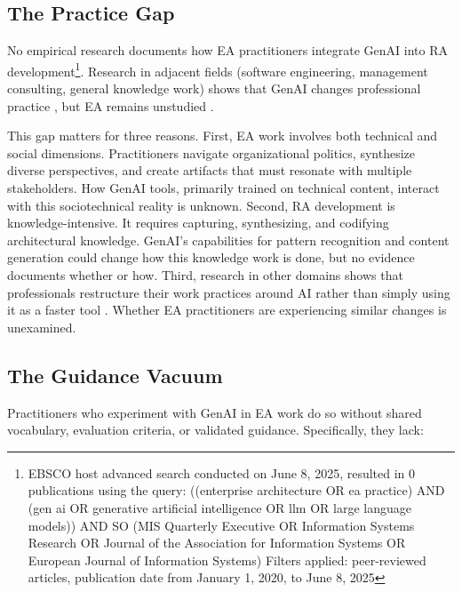 \subsection{The Practice Gap}

No empirical research documents how EA practitioners integrate GenAI into RA
development\footnote{ EBSCO host advanced search conducted on June 8, 2025,
    resulted in 0 publications using the query: ((enterprise architecture OR ea
    practice) AND (gen ai OR generative artificial intelligence OR llm OR large
    language models)) AND SO (MIS Quarterly Executive OR Information Systems
    Research OR Journal of the Association for Information Systems OR European
    Journal of Information Systems) Filters applied: peer-reviewed articles,
    publication date from January 1, 2020, to June 8, 2025
}. Research in adjacent fields (software engineering, management consulting,
general knowledge work) shows that GenAI changes professional practice
\parencite{peng_impact_2023, dellacqua_navigating_2023, noy_experimental_2023},
but EA remains unstudied
\parencite{banh_affordance_genai_ea_2025, ettinger_ea_dynamic_capability_2025}.

This gap matters for three reasons. First, EA work involves both technical and
social dimensions. Practitioners navigate organizational politics, synthesize
diverse perspectives, and create artifacts that must resonate with multiple
stakeholders. How GenAI tools, primarily trained on technical content, interact
with this sociotechnical reality is unknown. Second, RA development is
knowledge-intensive. It requires capturing, synthesizing, and codifying
architectural knowledge. GenAI's capabilities for pattern recognition and
content generation could change how this knowledge work is done, but no evidence
documents whether or how. Third, research in other domains shows that
professionals restructure their work practices around AI rather than simply
using it as a faster tool \parencite{noy_experimental_2023,
tankelevitch_metacognitive_2024, dellacqua_navigating_2023}. Whether EA
practitioners are experiencing similar changes is unexamined.

\subsection{The Guidance Vacuum}

Practitioners who experiment with GenAI in EA work do so without shared
vocabulary, evaluation criteria, or validated guidance. Specifically, they lack:

